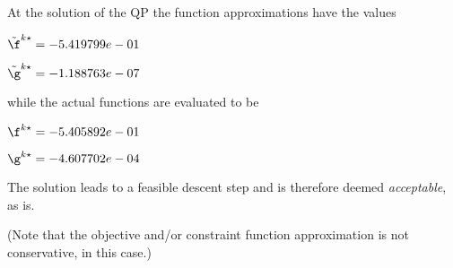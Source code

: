 At the solution of the QP the function approximations have the values

$\tilde \f^{k\star} = -5.419799e-01$

$\tilde \g^{k\star} = -1.188763e-07$

\bigskip
while the actual functions are evaluated to be

$\f^{k\star} = -5.405892e-01$

$\g^{k\star} = -4.607702e-04$

\bigskip
 The solution leads to a feasible descent step and                     is therefore deemed \emph{acceptable}, as is. 
 
(Note that the objective and/or constraint function approximation                         is not conservative, in this case.)